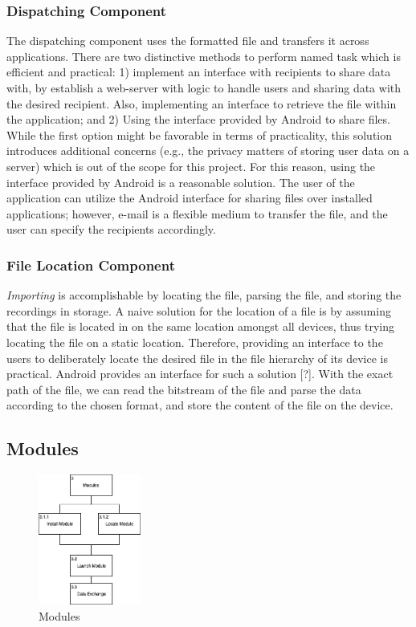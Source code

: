 \subsubsection{Dispatching Component}
The dispatching component uses the formatted file and transfers it across applications. There are two distinctive methods to perform named task which is efficient and practical: 1) implement an interface with recipients to share data with, by establish a web-server with logic to handle users and sharing data with the desired recipient. Also, implementing an interface to retrieve the file within the application;  and 2) Using the interface provided by Android to share files. While the first option might be favorable in terms of practicality, this solution introduces additional concerns (e.g., the privacy matters of storing user data on a server) which is out of the scope for this project. For this reason, using the interface provided by Android is a reasonable solution. The user of the application can utilize the Android interface for sharing files over installed applications; however, e-mail is a flexible medium to transfer the file, and the user can specify the recipients accordingly.  

\subsubsection{File Location Component}
\textit{Importing} is accomplishable by locating the file, parsing the file, and storing the recordings in storage. A naive solution for the location of a file is by assuming that the file is located in on the same location amongst all devices, thus trying locating the file on a static location. Therefore, providing an interface to the users to deliberately locate the desired file in the file hierarchy of its device is practical. Android provides an interface for such a solution [?]. With the exact path of the file, we can read the bitstream of the file and parse the data according to the chosen format, and store the content of the file on the device.

\subsection{Modules}

\begin{figure}
    \centering
    \includegraphics[width=0.3\textwidth]{images/Modules.png}
    \caption{Modules}
    \label{fig:hta_modules}
\end{figure}

